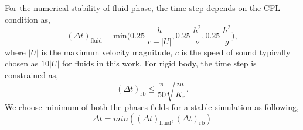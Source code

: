 For the numerical stability of fluid phase, the time step depends on the CFL condition as,
\begin{equation}
  \label{eq:time-step-cfl}
  (\Delta t)_{\text{fluid}} = \mathrm{min} \bigg( 0.25 \; \frac{h}{c + |U|} ,  0.25 \; \frac{h^2}{\nu},  0.25 \; \frac{h^2}{g} \bigg),
\end{equation}
where $|U|$ is the maximum velocity magnitude, $c$ is the speed of sound
typically chosen as $10 |U|$ for fluids in this work. For rigid body, the time
step is constrained as,
\begin{equation}
  \label{eq:time-step-body-force}
  (\Delta t)_{\text{rb}} \leq \frac{\pi}{50} \sqrt{\frac{m}{K_r}}.
\end{equation}
We choose minimum of both the phases fields for a stable simulation as following,
\begin{equation}
  \label{eq:time-step-body-force}
  \Delta t = min((\Delta t)_{\text{fluid}}, (\Delta t)_{\text{rb}})
\end{equation}






